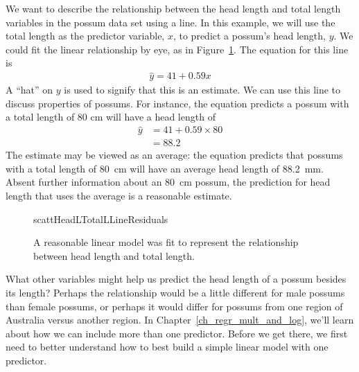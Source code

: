 We want to describe the relationship between the head length and total length variables in the possum data set using a line. In this example, we will use the total length as the predictor variable, $x$, to predict a possum's head length, $y$. We could fit the linear relationship by eye, as in Figure~\ref{scattHeadLTotalLLine}. The equation for this line is
\begin{align*}
\hat{y} = 41 + 0.59x
\end{align*}
A ``hat'' on $y$ is used to signify that this is an estimate.
We can use this line to discuss properties of possums.
For instance, the equation predicts a possum with a total length
of 80 cm will have a head length of
\begin{align*}
\hat{y} &= 41 + 0.59\times 80 \\
	&= 88.2 %
\end{align*}
The estimate may be viewed as an average:
the equation predicts that possums with a total length of
80~cm will have an average head length of 88.2~mm.
Absent further information about an 80~cm possum,
the prediction for head length that uses the average
is a reasonable estimate.

\begin{figure}
  \centering
      {scattHeadLTotalLLineResiduals}
  \caption{A reasonable linear model was fit to represent
      the relationship between head length and total length.}
  \label{scattHeadLTotalLLine}
\end{figure}

\begin{examplewrap}
\begin{nexample}{What other variables might help us predict the
    head length of a possum besides its length?}
  Perhaps the relationship would be a little different for
  male possums than female possums,
  or perhaps it would differ for possums from one region
  of Australia versus another region.
  In Chapter~\ref{ch_regr_mult_and_log},
  we'll learn about how we can include more than one predictor.
  Before we get there, we first need to better understand
  how to best build a simple linear model with one predictor.
\end{nexample}
\end{examplewrap}


